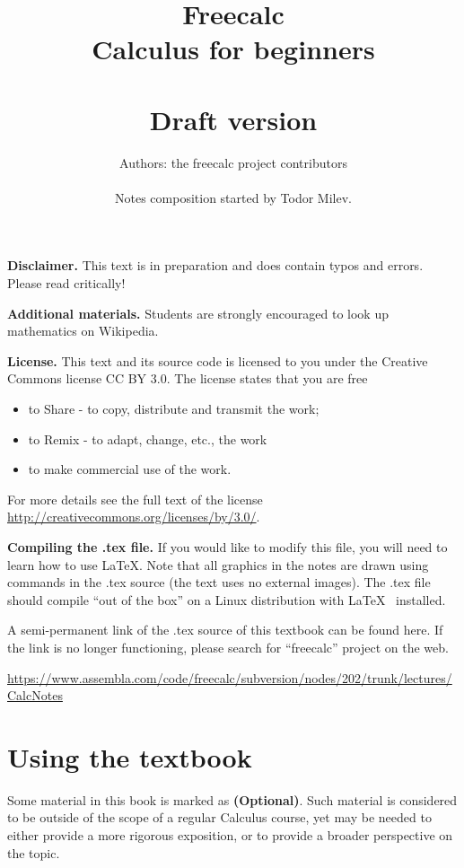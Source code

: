 \documentclass[12pt]{book}
\author{Authors: the freecalc project contributors \\~\\ Notes composition started by Todor Milev.}
\title{Freecalc \\ Calculus for beginners \\ ~ \\Draft version}
\newcommand{\optionalMaterial}{\textbf{(Optional)}}
\begin{document}
\maketitle




\noindent \textbf{Disclaimer. } This text is in preparation and does contain typos and errors. Please read critically!

\noindent \textbf{Additional materials.} Students are strongly encouraged to look up mathematics on Wikipedia. 


\noindent\textbf{License.} This text and its source code is licensed to you under the Creative Commons license CC BY 3.0. The license states that you are free
\begin{itemize}
\item to Share - to copy, distribute and transmit the work;
\item to Remix - to adapt, change, etc., the work
\item to make commercial use of the work.
\end{itemize}

For more details see the full text of the license \url{http://creativecommons.org/licenses/by/3.0/}.

\noindent \textbf{Compiling the .tex file.} If you would like to modify this file, you will need to learn how to use \LaTeX. Note that all graphics in the notes are drawn using commands in the .tex source (the text uses no external images). The .tex file should compile ``out of the box'' on a Linux distribution with \LaTeX~ installed.

A semi-permanent link of the .tex source of this textbook can be found here. If the link is no longer functioning, please search for ``freecalc'' project on the web.

\url{https://www.assembla.com/code/freecalc/subversion/nodes/202/trunk/lectures/CalcNotes}

\tableofcontents


\chapter{Using the textbook}

Some material in this book is marked as \optionalMaterial. Such material is considered to be outside of the scope of a regular Calculus course, yet may be needed to either provide a more rigorous exposition, or to provide a broader perspective on the topic. 
\end{document}
